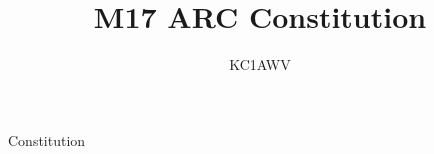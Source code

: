 \documentclass[english,12pt,letterpaper]{article}
\title{M17 ARC Constitution}
\author{KC1AWV}
\begin{document}
	Constitution
\end{document}
